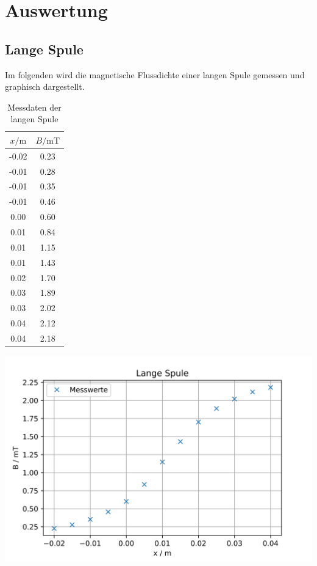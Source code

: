 \section{Auswertung}
\label{sec:Auswertung}

\subsection{Lange Spule}

Im folgenden wird die magnetische Flussdichte einer langen Spule gemessen und graphisch dargestellt.
\begin{table}
\centering
\caption{Messdaten der langen Spule}
\begin{tabular}{c c}
  \toprule
  $x / \unit\m$ &  $B / \unit{\milli\tesla}$ \\
  \midrule
  -0.02 &         0.23 \\
  -0.01 &         0.28 \\
  -0.01 &         0.35 \\
  -0.01 &         0.46 \\
    0.00 &         0.60 \\
    0.01 &         0.84 \\
    0.01 &         1.15 \\
    0.01 &         1.43 \\
    0.02 &         1.70 \\
    0.03 &         1.89 \\
    0.03 &         2.02 \\
    0.04 &         2.12 \\
    0.04 &         2.18 \\
  \bottomrule
\end{tabular}
\end{table}

\includegraphics[width=\textwidth]{pictures/LangeSpule1.png}    %

